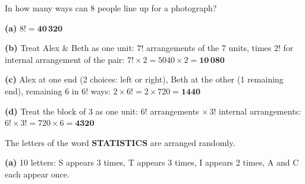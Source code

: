 \documentclass[addpoints]{exam}
\begin{document}
\begin{questions}
\question In how many ways can 8 people line up for a photograph?
\begin{solution}[9cm]
\textbf{(a)} $8! = \mathbf{40\,320}$

\textbf{(b)} Treat Alex \& Beth as one unit: $7!$ arrangements of the 7 units, times $2!$ for
internal arrangement of the pair:
$7! \times 2 = 5040 \times 2 = \mathbf{10\,080}$

\textbf{(c)} Alex at one end (2 choices: left or right), Beth at the other (1 remaining end),
remaining 6 in $6!$ ways:
$2 \times 6! = 2 \times 720 = \mathbf{1440}$

\textbf{(d)} Treat the block of 3 as one unit: $6!$ arrangements $\times\, 3!$ internal
arrangements:
$6! \times 3! = 720 \times 6 = \mathbf{4320}$
\end{solution}

\question The letters of the word \textbf{STATISTICS} are arranged randomly.
\begin{solution}[8cm]
\textbf{(a)} 10 letters: S appears 3 times, T appears 3 times, I appears 2 times,
A and C each appear once.


\end{solution}
\end{questions}
\end{document}
